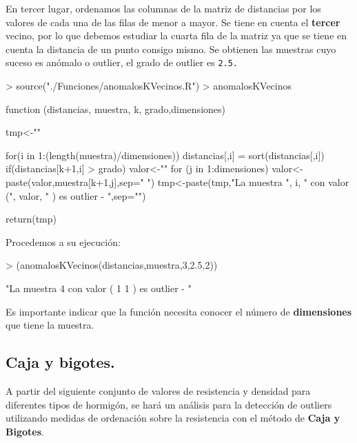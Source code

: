 \documentclass [a4paper] {article}
\begin{document}
\bigskip
En tercer lugar, ordenamos las columnas de la matriz de distancias por los valores de cada una de
las filas de menor a mayor. Se tiene en cuenta el \textbf{tercer} vecino, por lo que debemos estudiar la cuarta 
fila de la matriz ya que se tiene en cuenta la distancia de un punto consigo mismo. Se obtienen las 
muestras cuyo suceso es anómalo o outlier, el grado de outlier es \texttt{2.5.}
\begin{Schunk}
\begin{Sinput}
> source("./Funciones/anomalosKVecinos.R")
> anomalosKVecinos
\end{Sinput}
\begin{Soutput}
function (distancias, muestra, k, grado,dimensiones) {
    tmp<-""

    for(i in 1:(length(muestra)/dimensiones)){
        distancias[,i] = sort(distancias[,i])
        if(distancias[k+1,i] > grado) {
            valor<-""
            for (j in 1:dimensiones){
                valor<-paste(valor,muestra[k+1,j],sep=" ")
            }
            tmp<-paste(tmp,"La muestra ", i, 
                " con valor (", valor, " ) es outlier - ",sep="")
        }
    }

    return(tmp)
}
\end{Soutput}
\end{Schunk}

\bigskip
Procedemos a su ejecución:
\begin{Schunk}
\begin{Sinput}
> (anomalosKVecinos(distancias,muestra,3,2.5,2))
\end{Sinput}
\begin{Soutput}
[1] "La muestra 4 con valor ( 1 1 ) es outlier - "
\end{Soutput}
\end{Schunk}

\bigskip
Es importante indicar que la función necesita conocer el número de \textbf{dimensiones} que tiene
la muestra.

\subsection{Caja y bigotes.}
\bigskip
A partir del siguiente conjunto de valores de resistencia y densidad para diferentes tipos de hormigón,
se hará un análisis para la detección de outliers utilizando medidas de ordenación sobre la resistencia
con el método de \textbf{Caja y Bigotes}.
\end{document}
